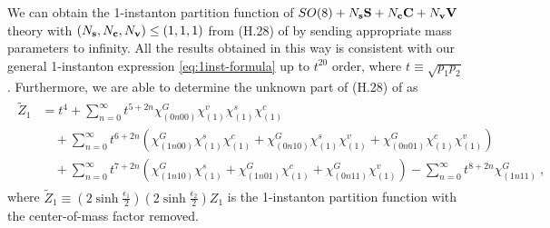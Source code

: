 \documentclass[letterpaper, 11pt]{article}
\def\e{\epsilon}
\begin{document}
{We can obtain the 1-instanton partition function of $SO(8) + N_{\bf s}\mathbf{S} + N_{\bf c}\mathbf{C} + N_{\bf v}\mathbf{V}$ theory with  $( N_{\bf s},  N_{\bf c}, N_{\bf v}) \leq ( 1,1,1)$ from (H.28) of \cite{DelZotto:2018tcj} by sending appropriate mass parameters to infinity.
All the results obtained in this way is consistent with our general 1-instanton expression \eqref{eq:1inst-formula} up to $t^{20}$ order, where $t \equiv \sqrt{p_1p_2}$. 
Furthermore, we are able to determine the unknown part of (H.28) of \cite{DelZotto:2018tcj} as 
\begin{align}
  \label{eq:SO8-v1s1c1}
  \begin{split}
 \tilde{Z}_1 &=  t^4 + \sum_{n=0}^\infty t^{5+2n} \chi_{(0n00)}^G \chi^v_{(1)}\chi^s_{(1)}\chi^c_{(1)} \\
 &\quad + \sum_{n=0}^\infty t^{6+2n}\left(\chi_{(1n00)}^G \chi^s_{(1)}\chi^c_{(1)}+ \chi_{(0n10)}^G \chi^s_{(1)}\chi^v_{(1)}
  +\chi_{(0n01)}^G \chi^c_{(1)}\chi^v_{(1)}\right)\\
 &\quad  + \sum_{n=0}^\infty t^{7+2n} \left(\chi^G_{(1n10)}\chi^s_{(1)} + \chi^G_{(1n01)}\chi^c_{(1)}+\chi^G_{(0n11)}\chi^v_{(1)}\right)- \sum_{n=0}^\infty t^{8+2n}\chi^G_{(1n11)} \ ,
 \end{split}
\end{align}
where $\tilde{Z}_1 \equiv (2\sinh{\frac{\e_{1}}{2}})(2\sinh{\frac{\e_{2}}{2}})  Z_1$ is the 1-instanton partition function with the center-of-mass factor removed. 


}
\end{document}

